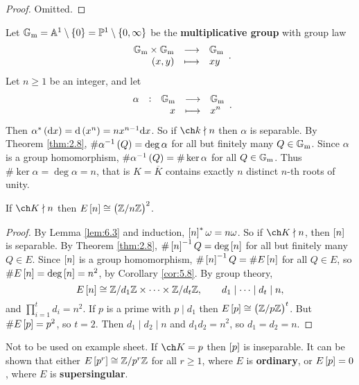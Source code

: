 \begin{proof}
Omitted.
\end{proof}


\begin{example*}
Let $ \GG_\m = \AA^1 \setminus \cbr{0} = \PP^1 \setminus \cbr{0, \infty} $ be the \textbf{multiplicative group} with group law
$$ \function{\GG_\m \times \GG_\m}{\GG_\m}{\br{x, y}}{xy}. $$
Let $ n \ge 1 $ be an integer, and let
$$ \function[\alpha]{\GG_\m}{\GG_\m}{x}{x^n}. $$
Then $ \alpha^*\br{\d x} = \d\br{x^n} = nx^{n - 1}\d x $. So if $ \ch k \nmid n $ then $ \alpha $ is separable. By Theorem \ref{thm:2.8}, $ \#\alpha^{-1}\br{Q} = \deg \alpha $ for all but finitely many $ Q \in \mathbb{G}_{\mathrm{m}} $. Since $ \alpha $ is a group homomorphism, $ \#\alpha^{-1}\br{Q} = \#\ker \alpha $ for all $ Q \in \mathbb{G}_{\mathrm{m}} $. Thus $ \#\ker \alpha = \deg \alpha = n $, that is $ K = \overline{K} $ contains exactly $ n $ distinct $ n $-th roots of unity.
\end{example*}

\begin{theorem}
\label{thm:6.5}
If $ \ch K \nmid n $ then $ E\sbr{n} \cong \br{\ZZ / n\ZZ}^2 $.
\end{theorem}

\begin{proof}
By Lemma \ref{lem:6.3} and induction, $ \sbr{n}^*\omega = n\omega $. So if $ \ch K \nmid n $, then $ \sbr{n} $ is separable. By Theorem \ref{thm:2.8}, $ \#\sbr{n}^{-1}Q = \deg \sbr{n} $ for all but finitely many $ Q \in E $. Since $ \sbr{n} $ is a group homomorphism, $ \#\sbr{n}^{-1}Q = \#E\sbr{n} $ for all $ Q \in E $, so $ \#E\sbr{n} = \deg \sbr{n} = n^2 $, by Corollary \ref{cor:5.8}. By group theory,
$$ E\sbr{n} \cong \ZZ / d_1\ZZ \times \dots \times \ZZ / d_t\ZZ, \qquad d_1 \mid \dots \mid d_t \mid n, $$
and $ \prod_{i = 1}^t d_i = n^2 $. If $ p $ is a prime with $ p \mid d_1 $ then $ E\sbr{p} \cong \br{\ZZ / p\ZZ}^t $. But $ \#E\sbr{p} = p^2 $, so $ t = 2 $. Then $ d_1 \mid d_2 \mid n $ and $ d_1d_2 = n^2 $, so $ d_1 = d_2 = n $.
\end{proof}

\begin{remark*}
Not to be used on example sheet. If $ \ch K = p $ then $ \sbr{p} $ is inseparable. It can be shown that either $ E\sbr{p^r} \cong \ZZ / p^r\ZZ $ for all $ r \ge 1 $, where $ E $ is \textbf{ordinary}, or $ E\sbr{p} = 0 $, where $ E $ is \textbf{supersingular}.
\end{remark*}

